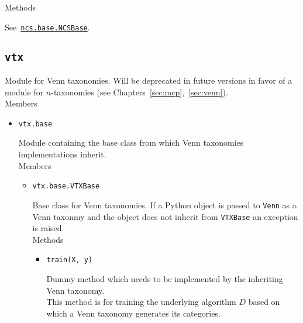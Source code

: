 \documentclass[twoside,11pt]{article}
\begin{document}
\begin{appendices}
\begin{itemize}
          Methods

          See~\hyperref[itm:ncsbase]
          {\texttt{ncs.base.NCSBase}}.

      \end{itemize}

    \subsection*{\texttt{vtx}}

      Module for Venn taxonomies. Will be deprecated in
      future versions in favor of a module for
      $n$-taxonomies (see
      Chapters~\ref{sec:mcp},~\ref{sec:venn}).
      \\

      Members

      \begin{itemize}

        \item
          \texttt{vtx.base}

          Module containing the base class from which Venn
          taxonomies implementations inherit.
          \\

          Members

          \begin{itemize}

            \item
              \texttt{vtx.base.VTXBase}
              \label{itm:vtxbase}

              Base class for Venn taxonomies. If a Python
              object is passed to \texttt{Venn} as a
              Venn taxonmy and the object does not inherit
              from \texttt{VTXBase} an exception is raised.
              \\

              Methods

              \begin{itemize}

                \item
                  \texttt{train(X, y)}

                  Dummy method which needs to be
                  implemented by the inheriting
                  Venn taxonomy.
                  \\

                  This method is for training the
                  underlying algorithm $D$ based on which
                  a Venn taxonomy generates its categories.
                  \\


\end{itemize}
\end{itemize}
\end{itemize}
\end{appendices}
\end{document}
